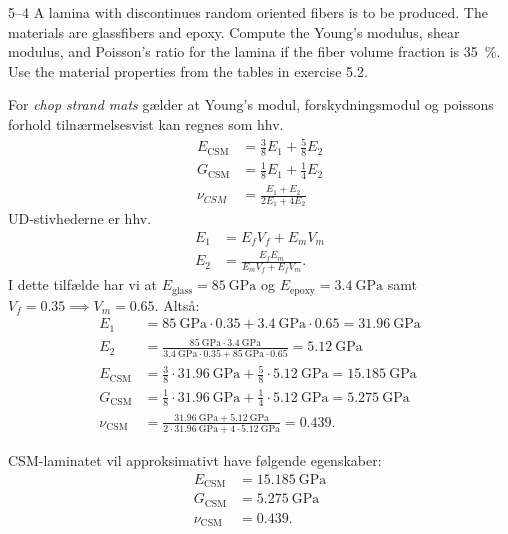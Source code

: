 
\begin{problem}{5--4}
  A lamina with discontinues random oriented fibers is to be produced. The materials are glassfibers and epoxy. Compute the Young’s modulus, shear modulus, and Poisson’s ratio for the lamina if the fiber volume fraction is \qty{35}{\%}. Use the material properties from the tables in exercise 5.2.
\end{problem}

\begin{derivation}
  For \textit{chop strand mats} gælder at Young's modul, forskydningsmodul og poissons forhold tilnærmelsesvist kan regnes som hhv.
  \begin{align*}
    E_{\mathrm{CSM}} &= \frac{3}{8}E_1 + \frac{5}{8}E_2 \\
    G_{\mathrm{CSM}} &= \frac{1}{8}E_1 + \frac{1}{4}E_2 \\
    \nu_{CSM} &= \frac{E_1 + E_2}{2 E_1 + 4 E_2}
  \end{align*}
  UD-stivhederne er hhv.
  \begin{align*}
    E_1 &= E_f V_f + E_m V_m \\
    E_2 &= \frac{E_f E_m}{E_m V_f + E_f V_m}
  .\end{align*}
  I dette tilfælde har vi at $E_{\text{glass}} = \qty{85}{\GPa}$ og $E_{\text{epoxy}} = \qty{3,4}{\GPa}$ samt $V_f = \num{0,35} \implies V_m = \num{0,65} $. Altså:
  \begin{align*}
    E_1 &= \qty{85}{\GPa} \cdot \num{0,35} + \qty{3,4}{\GPa} \cdot \num{0,65} = \qty{31.96}{\giga\pascal}\\
    E_2 &= \frac{\qty{85}{\GPa} \cdot \qty{3,4}{\GPa}}{\qty{3,4}{\GPa} \cdot \num{0,35} + \qty{85}{\GPa} \cdot \num{0,65} } = \qty{5.12}{\giga\pascal}\\
    E_{\mathrm{CSM}} &= \frac{3}{8} \cdot \qty{31,96}{\GPa} + \frac{5}{8} \cdot \qty{5,12}{\GPa} =\qty{15.185}{\giga\pascal}\\
    G_{\mathrm{CSM}} &= \frac{1}{8} \cdot \qty{31,96}{\GPa} + \frac{1}{4} \cdot \qty{5,12}{\GPa} = \qty{5.275}{\giga\pascal}\\
    \nu_{\mathrm{CSM}} &= \frac{\qty{31,96}{\GPa} + \qty{5,12}{\GPa}}{2 \cdot \qty{31,96}{\GPa} + 4 \cdot \qty{5,12}{\GPa} } = 0.439
  .\end{align*}
\end{derivation}

\begin{finalresult}
  CSM-laminatet vil approksimativt have følgende egenskaber:
  \begin{align*}
    E_{\mathrm{CSM}} &= \qty{15,185}{\GPa}  \\
    G_{\mathrm{CSM}} &= \qty{5,275}{\GPa} \\
    \nu_{\mathrm{CSM}} &= \num{0,439} 
  .\end{align*}
\end{finalresult}

